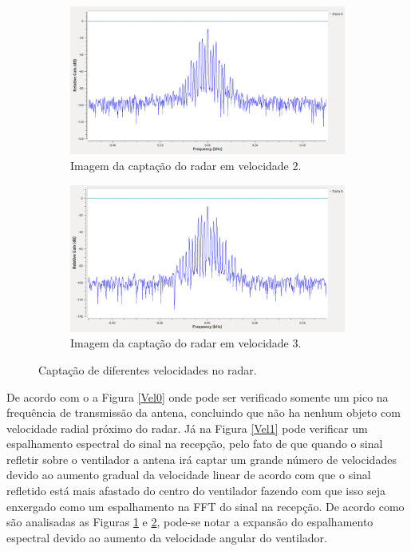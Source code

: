 \begin{figure}[H]\ContinuedFloat
    \centering
    \begin{subfigure}{\textwidth}
        \includegraphics[scale=0.3]{figuras/Ventilador_vel2.png}
    \caption{Imagem da captação do radar em velocidade 2.}
    \label{Vel2}
      \end{subfigure}
\begin{subfigure}{\textwidth}
       \includegraphics[scale=0.3]{figuras/Ventilador_vel3.png}
    \caption{Imagem da captação do radar em velocidade 3.}
    \label{Vel3}
      \end{subfigure}
      \caption{Captação de diferentes velocidades no radar.}
      \label{fig:velocidade}
\end{figure}



De acordo com o a Figura \ref{Vel0} onde pode ser verificado somente um pico na frequência de transmissão da antena, concluindo que não ha nenhum objeto com velocidade radial próximo do radar. Já na Figura \ref{Vel1} pode verificar um espalhamento espectral do sinal na recepção, pelo fato de que quando o sinal refletir sobre o ventilador a antena irá captar um grande número de velocidades devido ao aumento gradual da velocidade linear de acordo com que o sinal refletido está mais afastado do centro do ventilador fazendo com que isso seja enxergado como um espalhamento na FFT do sinal na recepção. De acordo como são analisadas as Figuras \ref{Vel2} e \ref{Vel3}, pode-se notar a expansão do espalhamento espectral devido ao aumento da velocidade angular do ventilador.


